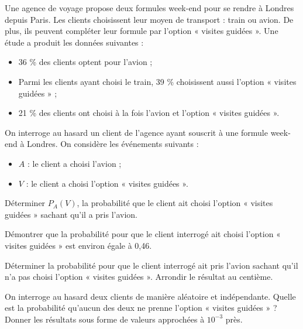 \documentclass[11pt]{article}
\begin{document}
\begin{exercice}
Une agence de voyage propose deux formules week-end pour se rendre à Londres depuis Paris. Les clients choisissent leur moyen de transport : train ou avion. De plus, ils peuvent compléter leur formule par l'option « visites guidées ». Une étude a produit les données suivantes :
\begin{itemize}
    \item 36 \% des clients optent pour l'avion ;
    \item Parmi les clients ayant choisi le train, 39 \% choisissent aussi l'option « visites guidées » ;
    \item 21 \% des clients ont choisi à la fois l'avion et l'option « visites guidées ».
\end{itemize}

On interroge au hasard un client de l'agence ayant souscrit à une formule week-end à Londres. On considère les événements suivants :
\begin{itemize}
    \item \(A\) : le client a choisi l'avion ;
    \item \(V\) : le client a choisi l'option « visites guidées ».
\end{itemize}

\begin{enu}
\item Déterminer \(P_A(V)\), la probabilité que le client ait choisi l'option « visites guidées » sachant qu'il a pris l'avion.
\item Démontrer que la probabilité pour que le client interrogé ait choisi l'option « visites guidées » est environ égale à 0,46.
\item Déterminer la probabilité pour que le client interrogé ait pris l'avion sachant qu'il n'a pas choisi l'option « visites guidées ». Arrondir le résultat au centième.
\item On interroge au hasard deux clients de manière aléatoire et indépendante. Quelle est la probabilité qu'aucun des deux ne prenne l'option « visites guidées » ? Donner les résultats sous forme de valeurs approchées à \(10^{-3}\) près.
\end{enu}
\end{exercice}
\end{document}
